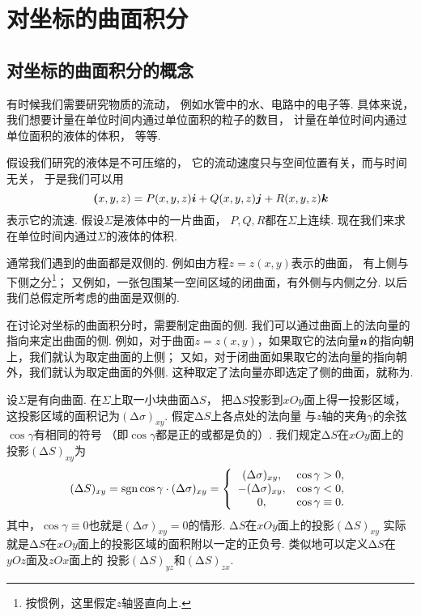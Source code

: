 \section{对坐标的曲面积分}
\subsection{对坐标的曲面积分的概念}
有时候我们需要研究物质的流动，
例如水管中的水、电路中的电子等.
具体来说，我们想要计量在单位时间内通过单位面积的粒子的数目，
计量在单位时间内通过单位面积的液体的体积，
等等.

假设我们研究的液体是不可压缩的，
它的流动速度只与空间位置有关，而与时间无关，
于是我们可以用\[
	\boldsymbol(x,y,z)
	= P(x,y,z)\boldsymbol{i}+Q(x,y,z)\boldsymbol{j}+R(x,y,z)\boldsymbol{k}
\]表示它的流速.
假设\(\Sigma\)是液体中的一片曲面，
\(P,Q,R\)都在\(\Sigma\)上连续.
现在我们来求在单位时间内通过\(\Sigma\)的液体的体积.

通常我们遇到的曲面都是双侧的.
例如由方程\(z = z(x,y)\)表示的曲面，
有上侧与下侧之分\footnote{按惯例，这里假定\(z\)轴竖直向上.}；
又例如，一张包围某一空间区域的闭曲面，有外侧与内侧之分.
以后我们总假定所考虑的曲面是双侧的.

在讨论对坐标的曲面积分时，需要制定曲面的侧.
我们可以通过曲面上的法向量的指向来定出曲面的侧.
例如，对于曲面\(z = z(x,y)\)，如果取它的法向量\(\boldsymbol{n}\)的指向朝上，我们就认为取定曲面的上侧；
又如，对于闭曲面如果取它的法向量的指向朝外，我们就认为取定曲面的外侧.
这种取定了法向量亦即选定了侧的曲面，就称为.

设\(\Sigma\)是有向曲面.
在\(\Sigma\)上取一小块曲面\(\increment S\)，
把\(\increment S\)投影到\(xOy\)面上得一投影区域，
这投影区域的面积记为\((\increment\sigma)_{xy}\).
假定\(\increment S\)上各点处的法向量
与\(z\)轴的夹角\(\gamma\)的余弦\(\cos\gamma\)有相同的符号
（即\(\cos\gamma\)都是正的或都是负的）.
我们规定\(\increment S\)在\(xOy\)面上的投影\((\increment S)_{xy}\)为\[
	(\Delta S)_{xy}
	= \operatorname{sgn}\cos\gamma \cdot (\Delta \sigma)_{xy}
	= \left\{ \begin{array}{cc}
	(\Delta \sigma)_{xy}, & \cos\gamma > 0, \\
	-(\Delta \sigma)_{xy}, & \cos\gamma < 0, \\
	0, & \cos\gamma \equiv 0.
	\end{array} \right.
\]
其中，\(\cos\gamma \equiv 0\)也就是\((\increment \sigma)_{xy} = 0\)的情形.
\(\increment S\)在\(xOy\)面上的投影\((\increment S)_{xy}\)
实际就是\(\increment S\)在\(xOy\)面上的投影区域的面积附以一定的正负号.
类似地可以定义\(\increment S\)在\(yOz\)面及\(zOx\)面上的
投影\((\increment S)_{yz}\)和\((\increment S)_{zx}\).

